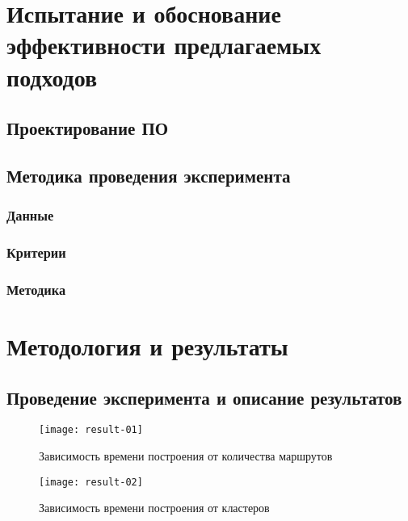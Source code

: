 \chapter{Испытание и обоснование эффективности предлагаемых подходов}
\section{Проектирование ПО}
\section{Методика проведения эксперимента}
\subsection{Данные}
\subsection{Критерии}
\subsection{Методика}

\chapter{Методология и результаты}
\section{Проведение эксперимента и описание результатов}

\begin{figure}[t!]
    \centering
    \texttt{[image: result-01]}
    \caption{Зависимость времени построения от количества маршрутов}
    \label{fig:result-01}
\end{figure}

\begin{figure}[t!]
    \centering
    \texttt{[image: result-02]}
    \caption{Зависимость времени построения от кластеров}
    \label{fig:result-02}
\end{figure}

